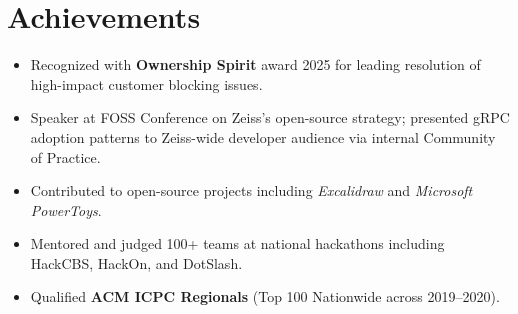 \documentclass[letterpaper,11pt]{article}
\newcommand{\achievementItem}[1]{
  \item\small{
    {#1 \vspace{-6pt}}
  }
}
\begin{document}
\section{Achievements}
\begin{itemize}[leftmargin=0.2in]
  \achievementItem{Recognized with \textbf{Ownership Spirit} award 2025 for leading resolution of high-impact customer blocking issues.}
  \achievementItem{Speaker at FOSS Conference on Zeiss's open-source strategy; presented gRPC adoption patterns to Zeiss-wide developer audience via internal Community of Practice.}
  \achievementItem{Contributed to open-source projects including \textit{Excalidraw} and \textit{Microsoft PowerToys}.}
  \achievementItem{Mentored and judged 100+ teams at national hackathons including HackCBS, HackOn, and DotSlash.}
  \achievementItem{Qualified \textbf{ACM ICPC Regionals} (Top 100 Nationwide across 2019–2020).}
\end{itemize}
\end{document}
